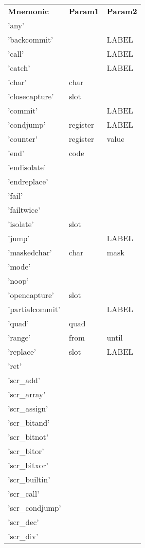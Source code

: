 
\centering
\caption{Naigama Assembly Instructions}
\label{tab:naig_assembly}
\begin{longtable}{lll}
\textbf{Mnemonic} & \textbf{Param1} & \textbf{Param2} \\
'any' &  &  \\
'backcommit' &  & LABEL \\
'call' &  & LABEL \\
'catch' &  & LABEL \\
'char' & char &  \\
'closecapture' & slot &  \\
'commit' &  & LABEL \\
'condjump' & register & LABEL \\
'counter' & register & value \\
'end' & code &  \\
'endisolate' &  &  \\
'endreplace' &  &  \\
'fail' &  &  \\
'failtwice' &  &  \\
'isolate' & slot &  \\
'jump' &  & LABEL \\
'maskedchar' & char & mask \\
'mode' &  &  \\
'noop' &  &  \\
'opencapture' & slot &  \\
'partialcommit' &  & LABEL \\
'quad' & quad &  \\
'range' & from & until \\
'replace' & slot & LABEL \\
'ret' &  &  \\
'scr\_add' &  &  \\
'scr\_array' &  &  \\
'scr\_assign' &  &  \\
'scr\_bitand' &  &  \\
'scr\_bitnot' &  &  \\
'scr\_bitor' &  &  \\
'scr\_bitxor' &  &  \\
'scr\_builtin' &  &  \\
'scr\_call' &  &  \\
'scr\_condjump' &  &  \\
'scr\_dec' &  &  \\
'scr\_div' &  &  \\

\end{longtable}
